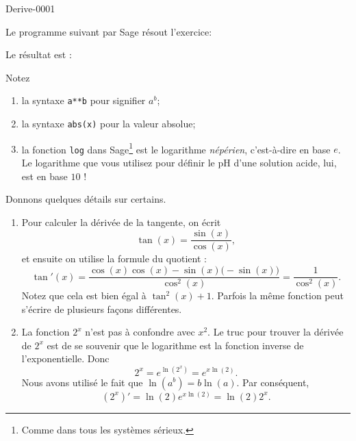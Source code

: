 
\begin{corrige}{Derive-0001}

Le programme suivant par Sage résout l'exercice:


Le résultat est :

Notez
\begin{enumerate}
	\item
		la syntaxe \verb+a**b+ pour signifier $a^b$;
	\item
		la syntaxe \verb+abs(x)+ pour la valeur absolue;
	\item
		la fonction \verb+log+ dans Sage\footnote{Comme dans tous les systèmes sérieux.} est le logarithme \emph{népérien}, c'est-à-dire en base $e$. Le logarithme que vous utilisez pour définir le pH d'une solution acide, lui, est en base $10$ !
\end{enumerate}

Donnons quelques détails sur certains.
\begin{enumerate}
	\item
		Pour calculer la dérivée de la tangente, on écrit
		\begin{equation}
			\tan(x)=\frac{ \sin(x) }{ \cos(x) },
		\end{equation}
		et ensuite on utilise la formule du quotient :
		\begin{equation}
			\tan'(x)=\frac{ \cos(x)\cos(x)-\sin(x)\big( -\sin(x) \big) }{ \cos^2(x) }=\frac{1}{ \cos^2(x) }.
		\end{equation}
		Notez que cela est bien égal à $\tan^2(x)+1$. Parfois la même fonction peut s'écrire de plusieurs façons différentes.
	\item
		La fonction $2^x$ n'est pas à confondre avec $x^2$. Le truc pour trouver la dérivée de $2^x$ est de se souvenir que le logarithme est la fonction inverse de l'exponentielle. Donc
		\begin{equation}
			2^x= e^{\ln(2^x)}= e^{x\ln(2)}.
		\end{equation}
		Nous avons utilisé le fait que $\ln(a^b)=b\ln(a)$. Par conséquent,
		\begin{equation}
			(2^x)'=\ln(2) e^{x\ln(2)}=\ln(2)2^{x}.
		\end{equation}
		

\end{enumerate}
\end{corrige}
